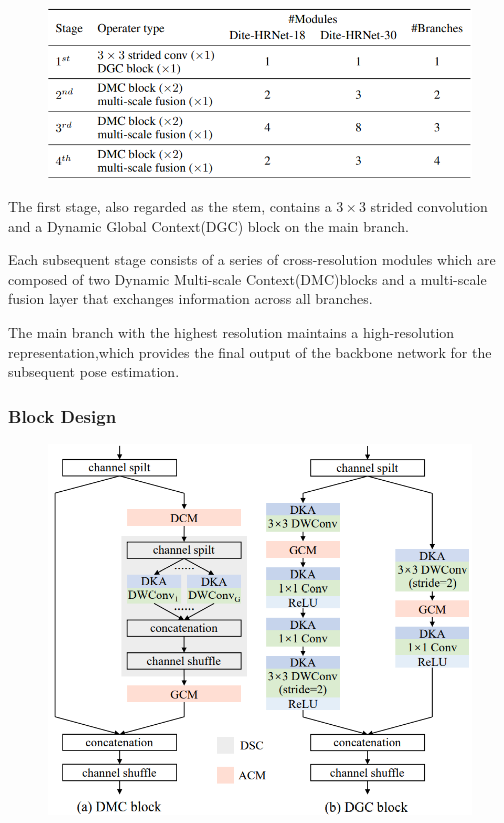 \documentclass[11pt]{article}
\begin{document}
\begin{figure}[H]
	\centering
	\includegraphics[scale=0.5]{95}
\end{figure}

The first stage, also regarded as the stem, contains a $3\times 3$ strided convolution and a Dynamic Global Context(DGC) block on the main branch.

Each subsequent stage consists of a series of cross-resolution modules which are composed of two Dynamic Multi-scale Context(DMC)blocks and a multi-scale fusion layer that exchanges information across all branches.

The main branch with the highest resolution maintains a high-resolution representation,which provides the final output of the backbone network for the subsequent pose estimation.

\subsubsection{Block Design}
\begin{figure}[H]
	\centering
	\includegraphics[scale=0.5]{96}
\end{figure}
\end{document}
